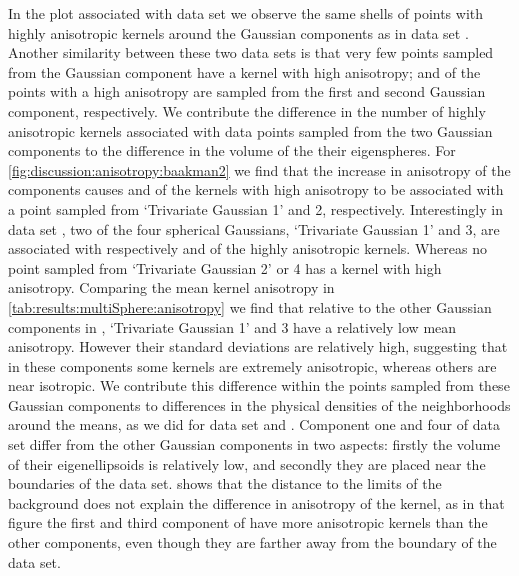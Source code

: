 			In the plot associated with data set \ferdosiTwo we observe the same shells of points with highly anisotropic kernels around the Gaussian components as in data set \ferdosiOne. Another similarity between these two data sets is that very few points sampled from the Gaussian component have a kernel with high anisotropy;  and  of the points with a high anisotropy are sampled from the first and second Gaussian component, respectively.
			We contribute the difference in the number of highly anisotropic kernels associated with data points sampled from the two Gaussian components to the difference in the volume of the their eigenspheres.
			For \cref{fig:discussion:anisotropy:baakman2} we find that the increase in anisotropy of the components causes  and  of the kernels with high anisotropy to be associated with a point sampled from `Trivariate Gaussian 1' and 2, respectively.
			Interestingly in data set \ferdosiThree, two of the four spherical Gaussians, `Trivariate Gaussian 1' and 3, are associated with respectively  and  of the highly anisotropic kernels. Whereas no point sampled from `Trivariate Gaussian 2' or 4 has a kernel with high anisotropy.
			Comparing the mean kernel anisotropy in \cref{tab:results:multiSphere:anisotropy} we find that relative to the other Gaussian components in \ferdosiThree, `Trivariate Gaussian 1' and 3 have a relatively low mean anisotropy. However their standard deviations are relatively high, suggesting that in these components some kernels are extremely anisotropic, whereas others are near isotropic. We contribute this difference within the points sampled from these Gaussian components to differences in the physical densities of the neighborhoods around the means, as we did for data set \ferdosiOne and \baakmanOne.
			Component one and four of data set \ferdosiThree differ from the other Gaussian components in two aspects: firstly the volume of their eigenellipsoids is relatively low, and secondly they are placed near the boundaries of the data set.
				 shows that the distance to the limits of the background does not explain the difference in anisotropy of the kernel, as in that figure the first and third component of \ferdosiThreeNoise have more anisotropic kernels than the other components, even though they are farther away from the boundary of the data set.
